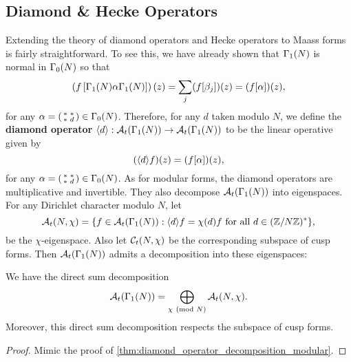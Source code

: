     \subsection*{Diamond \& Hecke Operators}
      Extending the theory of diamond operators and Hecke operators to Maass forms is fairly straightforward. To see this, we have already shown that $\Gamma_{1}(N)$ is normal in $\Gamma_{0}(N)$ so that
      \[
        \left(f\left[\Gamma_{1}(N)\alpha\Gamma_{1}(N)\right]\right)(z) = \sum_{j}(f[\beta_{j}])(z) = (f[\alpha])(z),
      \]
      for any $\alpha = \begin{psmallmatrix} \ast & \ast \\ \ast & d \end{psmallmatrix} \in \Gamma_{0}(N)$. Therefore, for any $d$ taken modulo $N$, we define the \textbf{diamond operator} $\langle d\rangle:\mathcal{A}_{t}(\Gamma_{1}(N)) \to \mathcal{A}_{t}(\Gamma_{1}(N))$ to be the linear operative given by
      \[
        (\langle d\rangle f)(z) = (f[\alpha])(z),
      \]
      for any $\alpha = \begin{psmallmatrix} \ast & \ast \\ \ast & d \end{psmallmatrix} \in \Gamma_{0}(N)$. As for modular forms, the diamond operators are multiplicative and invertible. They also decompose $\mathcal{A}_{t}(\Gamma_{1}(N))$ into eigenspaces. For any Dirichlet character modulo $N$, let
      \[
        \mathcal{A}_{t}(N,\chi) = \{f \in \mathcal{A}_{t}(\Gamma_{1}(N)):\langle d\rangle f = \chi(d)f \text{ for all } d \in (\mathbb{Z}/N\mathbb{Z})^{\ast}\},
      \]
      be the $\chi$-eigenspace. Also let $\mathcal{C}_{t}(N,\chi)$ be the corresponding subspace of cusp forms. Then $\mathcal{A}_{t}(\Gamma_{1}(N))$ admits a decomposition into these eigenspaces:

      \begin{proposition}\label{thm:diamond_operator_decomposition_Maass}
        We have the direct sum decomposition
        \[
          \mathcal{A}_{t}(\Gamma_{1}(N)) = \bigoplus_{\chi \ \left(\text{mod }N\right)}\mathcal{A}_{t}(N,\chi).
        \]
        Moreover, this direct sum decomposition respects the subspace of cusp forms.
      \end{proposition}
      \begin{proof}
        Mimic the proof of \cref{thm:diamond_operator_decomposition_modular}.
      \end{proof}

